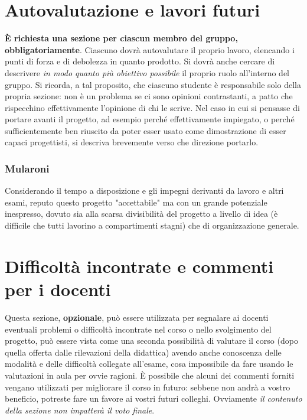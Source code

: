 \documentclass[a4paper,12pt]{report}
\begin{document}
\section{Autovalutazione e lavori futuri}

\textbf{È richiesta una sezione per ciascun membro del gruppo, obbligatoriamente}.
%
Ciascuno dovrà autovalutare il proprio lavoro, elencando i punti di forza e di debolezza in quanto prodotto.
Si dovrà anche cercare di descrivere \emph{in modo quanto più obiettivo possibile} il proprio ruolo all'interno del gruppo.
Si ricorda, a tal proposito, che ciascuno studente è responsabile solo della propria sezione: non è un problema se ci sono opinioni contrastanti, a patto che rispecchino effettivamente l'opinione di chi le scrive.
Nel caso in cui si pensasse di portare avanti il progetto, ad esempio perché effettivamente impiegato, o perché sufficientemente ben riuscito da poter esser usato come dimostrazione di esser capaci progettisti, si descriva brevemente verso che direzione portarlo.

\subsubsection{Mularoni}
Considerando il tempo a disposizione e gli impegni derivanti da lavoro e altri esami, reputo questo progetto "accettabile" ma con un grande potenziale inespresso,
%
dovuto sia alla scarsa divisibilità del progetto a livello di idea (è difficile che tutti lavorino a compartimenti stagni) che di organizzazione generale.
\section{Difficoltà incontrate e commenti per i docenti}

Questa sezione, \textbf{opzionale}, può essere utilizzata per segnalare ai docenti eventuali problemi o difficoltà incontrate nel corso o nello svolgimento del progetto, può essere vista come una seconda possibilità di valutare il corso (dopo quella offerta dalle rilevazioni della didattica) avendo anche conoscenza delle modalità e delle difficoltà collegate all'esame, cosa impossibile da fare usando le valutazioni in aula per ovvie ragioni.
%
È possibile che alcuni dei commenti forniti vengano utilizzati per migliorare il corso in futuro: sebbene non andrà a vostro beneficio, potreste fare un favore ai vostri futuri colleghi.
%
Ovviamente \textit{il contenuto della sezione non impatterà il voto finale}.

\appendix
\end{document}
